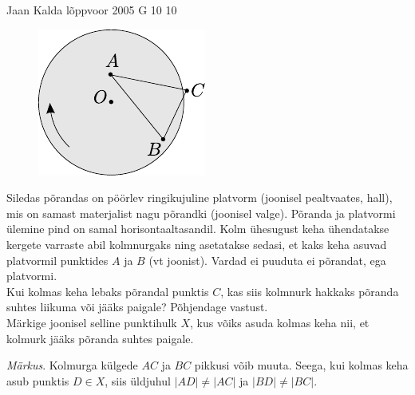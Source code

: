 \documentclass[11pt, twoside]{article}
\begin{document}
{%
{Jaan Kalda} %
{lõppvoor} %
{2005} %
{G 10} %
{10} %
{
\ifStatement
\begin{figure}
	\begin{center}
		\vspace{-20pt}
		\includegraphics[width=\linewidth]{2005-v3g-10-yl}
	\end{center}
\end{figure}
Siledas põrandas on pöörlev ringikujuline platvorm (joonisel pealtvaates, hall), mis on samast materjalist nagu põrandki (joonisel valge). Põranda ja platvormi ülemine pind on samal horisontaaltasandil. Kolm ühesugust keha ühendatakse kergete varraste abil kolmnurgaks ning asetatakse sedasi, et kaks keha asuvad platvormil punktides $A$ ja $B$ (vt joonist). Vardad ei puuduta ei põrandat, ega platvormi.\\
\osa Kui kolmas keha lebaks põrandal punktis $C$, kas siis kolmnurk hakkaks põranda suhtes liikuma või jääks paigale? Põhjendage vastust.\\
\osa Märkige joonisel selline punktihulk $X$, kus võiks asuda kolmas keha nii, et kolmurk jääks põranda suhtes paigale.

\emph{Märkus}. Kolmurga külgede $AC$ ja $BC$ pikkusi võib muuta. Seega, kui kolmas keha asub punktis $D \in X$, siis üldjuhul $|AD| \neq |AC|$ ja $|BD| \neq |BC|$.
\fi
}
\newpage\subsection{\protect{}}

}
\end{document}
